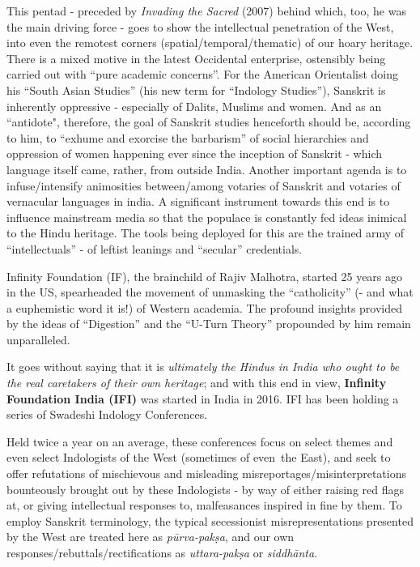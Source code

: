 This pentad - preceded by {\sl Invading the Sacred} (2007) behind which, too, he was the main driving force - goes to show the intellectual penetration of the West, into even the remotest corners (spatial/temporal/\break thematic) of our hoary heritage. There is a mixed motive in the latest Occidental enterprise,  ostensibly being carried out with “pure academic concerns”. For the American Orientalist doing his ``South Asian Studies'' (his new term for “Indology Studies”), Sanskrit is inherently oppressive - especially of Dalits, Muslims and women. And as an ``antidote", therefore, the goal of Sanskrit studies henceforth should be, according to him, to ``exhume and exorcise the barbarism'' of social hierarchies and oppression of women happening ever since the inception of Sanskrit - which language itself came, rather, from outside India. Another important agenda is to infuse/intensify animosities between/among votaries of Sanskrit and votaries of vernacular languages in india. A significant instrument towards this end is to influence mainstream media so that the populace is constantly fed ideas inimical to the Hindu heritage. The tools being deployed for this are the trained army of “intellectuals” - of leftist leanings and “secular” credentials.
\vskip 1.5pt

Infinity Foundation (IF), the brainchild of Rajiv Malhotra, started 25 years ago in the US, spearheaded the movement of unmasking the “catholicity” (- and what a euphemistic word it is!) of Western academia. The profound insights provided by the ideas of ``Digestion'' and the “U-Turn Theory” propounded by him remain unparalleled.
\vskip 1.5pt

It goes without saying that it is {\sl ultimately the Hindus in India who ought to be the real caretakers of their own heritage}; and with this end in view, {\bf Infinity Foundation India (IFI)} was started in India in 2016. IFI has been holding a series of Swadeshi Indology Conferences. 
\vskip 1.5pt

Held twice a year on an average, these conferences focus on select themes and even select Indologists of the West (sometimes of even~the East), and seek to offer refutations of mischievous  and misleading misreportages/misinterpretations bounteously brought out by these Indologists - by way of either raising red flags at, or giving intellectual responses to, malfeasances inspired in fine by them. To employ Sanskrit terminology, the typical secessionist misrepresentations presented by the West are treated here as {\sl pūrva-pakṣa}, and our own responses/rebuttals/rectifications as {\sl uttara-pakṣa} or {\sl siddhānta}. 

